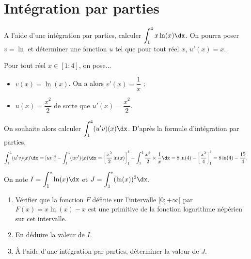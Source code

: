 \documentclass[11pt,fleqn, openany]{book} %
\begin{document}
\section*{Intégration par parties}


\begin{exercise}
A l'aide d'une intégration par parties, calculer $\displaystyle\int_{1}^4 x\ln(x)\dx$. On pourra poser $v=\ln$ et déterminer une fonction $u$ tel que pour tout réel $x$, $u'(x)=x$.\end{exercise}

\begin{solution}
Pour tout réel \(x\in[1;4]\), on pose...
\begin{itemize}
\item  \(v(x)=\ln(x)\). On a alors \(v'(x)=\dfrac{1}{x}\) ;
\item  \(u(x)=\dfrac{x^2}{2}\) de sorte que \(u'(x)=\dfrac{x^2}{2}\).
\end{itemize}

On souhaite alors calculer \(\displaystyle\int_{1}^4 (u'v)(x)\dx\). D'après la formule d'intégration par parties,
\[ \displaystyle\int_{1}^4 (u'v)(x)\dx = [uv]_1^4 - \displaystyle\int_{1}^4 (uv')(x)\dx=\left[\dfrac{x^2}{2}\ln(x)\right]_1^4-\displaystyle\int_{1}^4 \dfrac{x^2}{2} \times \dfrac{1}{x}\dx=8\ln(4)- \left[ \dfrac{x^2}{4}\right]_1^4 = 8\ln(4)-\dfrac{15}{4}.\]\end{solution}



\begin{exercise}[subtitle={(Un extrait d'exercice que j'ai eu au bac...)}]
On note $I=\displaystyle\int_1^e \ln(x) \dx$ et $J=\displaystyle\int_1^e (\ln(x))^2\dx$.
\begin{enumerate}
\item Vérifier que la fonction $F$ définie sur l'intervalle $]0;+\infty[$ par $F(x)=x\ln(x)-x$ est une primitive de la fonction logarithme népérien sur cet intervalle.
\item En déduire la valeur de $I$.
\item À l'aide d'une intégration par parties, déterminer la valeur de $J$.
\end{enumerate}
\end{exercise}
\end{document}
